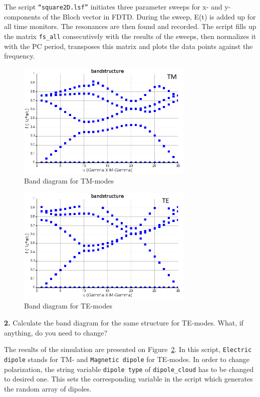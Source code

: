 \documentclass[11pt,a4paper]{article}
\begin{document}
The script \verb|“square2D.lsf”| initiates three parameter sweeps for x- and y-components of the Bloch vector in FDTD. During the sweep, E(t) is added up for all time monitors. The resonances are then found and recorded. The script fills up the matrix \verb|fs_all| consecutively with the results of the sweeps, then normalizes it with the PC period, transposes this matrix and plots the data points against the frequency. 
\begin{figure}[ht]
   \centering
    \includegraphics[width=0.75\textwidth]{electric_dipole.png}
    \caption{Band diagram for TM-modes}
    \label{fig:TM}
\end{figure}
\begin{figure}[ht]
   \centering
    \includegraphics[width=0.75\textwidth]{magnetic_dipole.png}
    \caption{Band diagram for TE-modes}
    \label{fig:TE}
\end{figure}
\begin{displayquote}
    \textbf{2.} Calculate the band diagram for the same structure for TE-modes. What, if anything, do you need to change?
\end{displayquote}

The results of the simulation are presented on Figure~\ref{fig:TE}. 
In this script, \verb|Electric dipole| stands for TM- and \verb|Magnetic dipole| for TE-modes. In order to change polarization, the string variable \verb|dipole type| of \verb|dipole_cloud| has to be changed to desired one. This sets the corresponding variable in the script which generates the random array of dipoles. 
\end{document}
